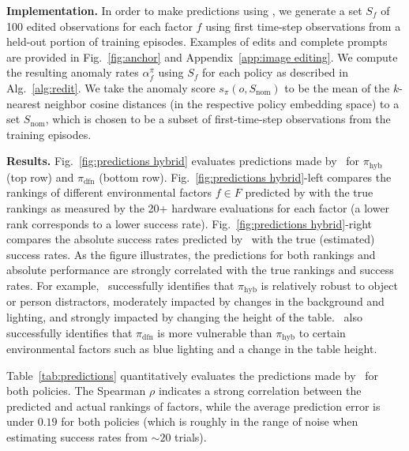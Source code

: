 {\bf Implementation.} In order to make predictions using \redit, we generate a set $S_f$ of 100 edited observations for each factor $f$ using first time-step observations from a held-out portion of training episodes. Examples of edits and complete prompts are provided in Fig.~\ref{fig:anchor} and Appendix~\ref{app:image editing}. We compute the resulting anomaly rates $\alpha_f^\pi$ using $S_f$ for each policy as described in Alg.~\ref{alg:redit}. 
We take the anomaly score $s_\pi(o, S_\text{nom})$ to be the mean of the $k$-nearest neighbor cosine distances (in the respective policy embedding space) to a set $S_\text{nom}$, which is chosen to be a subset of first-time-step observations from the training episodes.

{\bf Results.} Fig.~\ref{fig:predictions hybrid} evaluates predictions made by \redit~for $\pi_\text{hyb}$ (top row) and $\pi_\text{dfn}$ (bottom row). Fig.~\ref{fig:predictions hybrid}-left compares the rankings of different environmental factors $f \in F$ predicted by \redit with the true rankings as measured by the 20+ hardware evaluations for each factor (a lower rank corresponds to a lower success rate). Fig.~\ref{fig:predictions hybrid}-right compares the absolute success rates predicted by \redit~with the true (estimated) success rates. As the figure illustrates, the predictions for both rankings and absolute performance are strongly correlated with the true rankings and success rates. For example, \redit~successfully identifies that $\pi_\text{hyb}$ is relatively robust to object or person distractors, moderately impacted by changes in the background and lighting, and strongly impacted by changing the height of the table. \redit~also successfully identifies that $\pi_\text{dfn}$ is more vulnerable than $\pi_\text{hyb}$ to certain environmental factors such as blue lighting and a change in the table height.  

Table~\ref{tab:predictions} quantitatively evaluates the predictions made by \redit~for both policies. The Spearman $\rho$ indicates a strong correlation between the predicted and actual rankings of factors, while the average prediction error is under $0.19$ for both policies (which is roughly in the range of noise when estimating success rates from $\sim 20$ trials). 

\begin{table}[h]
\centering
{}
\caption{Quantitative evaluation of success rates predicted by \redit compared with real success rates.}
\label{tab:predictions}
\vspace{-5pt}
\end{table}

